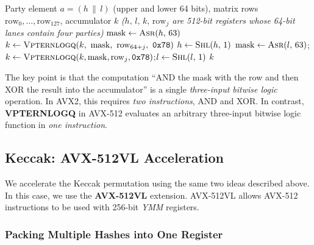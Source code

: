 \begin{algorithm}[h]
\caption{Linear-layer accumulation: mask generation and VPTERNLOGQ}
\label{alg:matmul}
\begin{algorithmic}[1]
\Require Party element $a=(h\,\|\,l)$ (upper and lower 64 bits), matrix rows $\mathrm{row}_0,\dots,\mathrm{row}_{127}$, accumulator $k$
\Statex \textit{($h,\,l,\,k,\,\mathrm{row}_j$ are 512-bit registers whose 64-bit lanes contain four parties)}
 
\State $\mathrm{mask} \gets \Call{Asr}{h,\,63}$ 
\State $k \gets \Call{Vpternlogq}{k,\ \mathrm{mask},\ \mathrm{row}_{64+j},\ \texttt{0x78}}$ 
\State $h \gets \Call{Shl}{h,\,1}$ 
\EndFor
{} 
\State $\mathrm{mask} \gets \Call{Asr}{l,\,63}$;\quad $k \gets \Call{Vpternlogq}{k, \mathrm{mask}, \mathrm{row}_{j}, \texttt{0x78}}$;\quad $l \gets \Call{Shl}{l,\,1}$
\EndFor
\State \Return $k$
\end{algorithmic}
\end{algorithm}

The key point is that the computation ``AND the mask with the row and then XOR the result into the accumulator'' is a single \emph{three-input bitwise logic} operation. In AVX2, this requires \emph{two instructions}, AND and XOR. In contrast, \textbf{VPTERNLOGQ} in AVX-512 evaluates an arbitrary three-input bitwise logic function in \emph{one instruction}.

\subsection{Keccak: AVX-512VL Acceleration}
\label{sec:keccak}

We accelerate the Keccak permutation using the same two ideas described above. In this case, we use the \textbf{AVX-512VL} extension. AVX-512VL allows AVX-512 instructions to be used with 256-bit \emph{YMM} registers.

\subsubsection{Packing Multiple Hashes into One Register}

